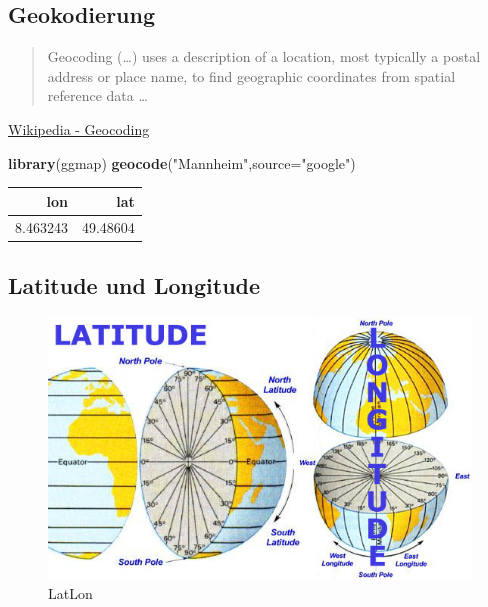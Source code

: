 \documentclass[]{article}
\newenvironment{Shaded}{\begin{snugshade}}{\end{snugshade}}
\newcommand{\KeywordTok}[1]{\textcolor[rgb]{0.13,0.29,0.53}{\textbf{{#1}}}}
\newcommand{\DataTypeTok}[1]{\textcolor[rgb]{0.13,0.29,0.53}{{#1}}}
\newcommand{\StringTok}[1]{\textcolor[rgb]{0.31,0.60,0.02}{{#1}}}
\newcommand{\NormalTok}[1]{{#1}}
\begin{document}
\subsection{Geokodierung}\label{geokodierung}

\begin{quote}
Geocoding (\ldots{}) uses a description of a location, most typically a
postal address or place name, to find geographic coordinates from
spatial reference data \ldots{}
\end{quote}

\href{https://github.com/adam-p/markdown-here/wiki/Markdown-Cheatsheet\#blockquotes}{Wikipedia
- Geocoding}

\begin{Shaded}
\begin{Highlighting}[]
\KeywordTok{library}\NormalTok{(ggmap)}
\KeywordTok{geocode}\NormalTok{(}\StringTok{"Mannheim"}\NormalTok{,}\DataTypeTok{source=}\StringTok{"google"}\NormalTok{)}
\end{Highlighting}
\end{Shaded}

\begin{longtable}[]{@{}rr@{}}
\toprule
lon & lat\tabularnewline
\midrule
\endhead
8.463243 & 49.48604\tabularnewline
\bottomrule
\end{longtable}

\subsection{Latitude und Longitude}\label{latitude-und-longitude}

\begin{figure}[htbp]
\centering
\includegraphics{figure/definition-of-latitude-longitude.jpg}
\caption{LatLon}
\end{figure}
\end{document}
